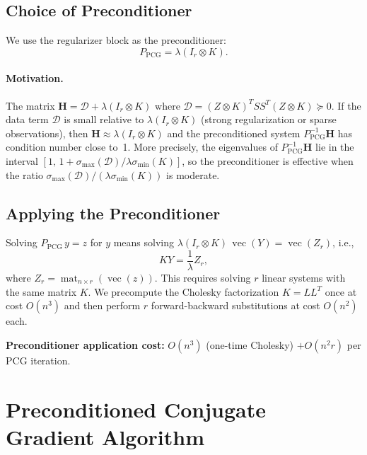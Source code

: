 \documentclass[12pt]{article}
\theoremstyle{definition}
\DeclareMathOperator{\vecop}{vec}
\DeclareMathOperator{\mat}{mat}
\begin{document}
\subsection{Choice of Preconditioner}

We use the regularizer block as the preconditioner:
\begin{equation}
  P_{\mathrm{PCG}} = \lambda(I_r \otimes K).
  \label{eq:precond}
\end{equation}

\paragraph{Motivation.}
The matrix $\mathbf{H} = \mathcal{D} + \lambda(I_r \otimes K)$ where
$\mathcal{D} = (Z \otimes K)^T SS^T (Z \otimes K) \succeq 0$.  If the data term $\mathcal{D}$
is small relative to $\lambda(I_r \otimes K)$ (strong regularization or sparse observations),
then $\mathbf{H} \approx \lambda(I_r \otimes K)$ and the preconditioned system
$P_{\mathrm{PCG}}^{-1} \mathbf{H}$ has condition number close to~1.  More precisely, the
eigenvalues of $P_{\mathrm{PCG}}^{-1}\mathbf{H}$ lie in the interval
$[1,\, 1 + \sigma_{\max}(\mathcal{D})/\lambda\sigma_{\min}(K)]$, so the preconditioner
is effective when the ratio $\sigma_{\max}(\mathcal{D})/(\lambda\sigma_{\min}(K))$ is moderate.

\subsection{Applying the Preconditioner}

Solving $P_{\mathrm{PCG}}\,y = z$ for $y$ means solving
$\lambda(I_r \otimes K)\,\vecop(Y) = \vecop(Z_r)$, i.e.,
\[
  KY = \frac{1}{\lambda} Z_r,
\]
where $Z_r = \mat_{n \times r}(\vecop(z))$.  This requires solving $r$ linear systems with the
same matrix $K$.  We precompute the Cholesky factorization $K = LL^T$ once at cost $O(n^3)$
and then perform $r$ forward-backward substitutions at cost $O(n^2)$ each.

\textbf{Preconditioner application cost:} $O(n^3)$ (one-time Cholesky) $+ O(n^2 r)$ per PCG
iteration.

\section{Preconditioned Conjugate Gradient Algorithm}
\end{document}
